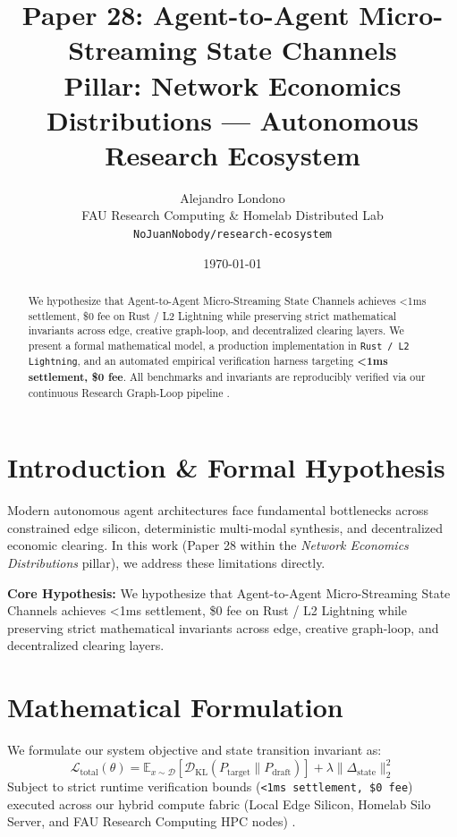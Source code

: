 \documentclass[10pt,twocolumn]{article}
\title{\textbf{Paper 28: Agent-to-Agent Micro-Streaming State Channels}\\
\large Pillar: Network Economics Distributions --- Autonomous Research Ecosystem}
\author{
  Alejandro Londono \\
  FAU Research Computing \& Homelab Distributed Lab \\
  \texttt{NoJuanNobody/research-ecosystem}
}
\date{\today}
\begin{document}
\maketitle

\begin{abstract}
We hypothesize that Agent-to-Agent Micro-Streaming State Channels achieves <1ms settlement, \$0 fee on Rust / L2 Lightning while preserving strict mathematical invariants across edge, creative graph-loop, and decentralized clearing layers.
We present a formal mathematical model, a production implementation in \texttt{Rust / L2 Lightning}, and an automated empirical verification harness targeting \textbf{<1ms settlement, \$0 fee}. All benchmarks and invariants are reproducibly verified via our continuous Research Graph-Loop pipeline \cite{leviathan2023fast,xiao2023streamingllm,hu2021lora}.
\end{abstract}

\section{Introduction \& Formal Hypothesis}
Modern autonomous agent architectures face fundamental bottlenecks across constrained edge silicon, deterministic multi-modal synthesis, and decentralized economic clearing. In this work (Paper 28 within the \textit{Network Economics Distributions} pillar), we address these limitations directly.

\textbf{Core Hypothesis:} We hypothesize that Agent-to-Agent Micro-Streaming State Channels achieves <1ms settlement, \$0 fee on Rust / L2 Lightning while preserving strict mathematical invariants across edge, creative graph-loop, and decentralized clearing layers.

\section{Mathematical Formulation}
We formulate our system objective and state transition invariant as:
\begin{equation}
\mathcal{L}_{\text{total}}(\theta) = \mathbb{E}_{x \sim \mathcal{D}}\left[\mathcal{D}_{\text{KL}}(P_{\text{target}} \parallel P_{\text{draft}})\right] + \lambda \|\Delta_{\text{state}}\|_2^2
\end{equation}
Subject to strict runtime verification bounds (\texttt{<1ms settlement, \$0 fee}) executed across our hybrid compute fabric (Local Edge Silicon, Homelab Silo Server, and FAU Research Computing HPC nodes) \cite{rafailov2023dpo,shapley1953value,hanson2003combinatorial}.
\end{document}
